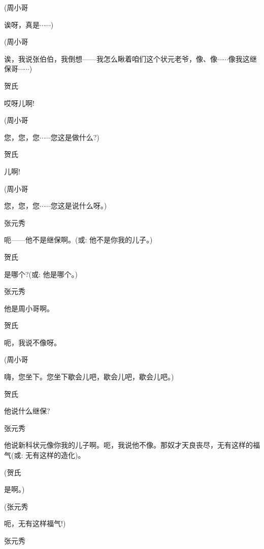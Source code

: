 (周小哥\hspace{20pt}~

诶呀，真是$\cdots{}\cdots{}$)

(周小哥

诶，我说张伯伯，我倒想------我怎么瞅着咱们这个状元老爷，像、像$\cdots{}\cdots{}$像我这继保哥$\cdots{}\cdots{}$)

贺氏\hspace{30pt}~

哎呀儿啊!

(周小哥\hspace{20pt}~

您，您，您$\cdots{}\cdots{}$您这是做什么?)

贺氏\hspace{30pt}~

儿啊!

(周小哥\hspace{20pt}~

您，您，您$\cdots{}\cdots{}$您这是说什么呀。)

张元秀\hspace{20pt}~

呃------他不是继保啊。({\akai 或}: 他不是你我的儿子。)

贺氏\hspace{30pt}~

是哪个?({\akai 或}: 他是哪个。)

张元秀\hspace{20pt}~

他是周小哥啊。

贺氏\hspace{30pt}~

呃，我说不像呀。

(周小哥\hspace{20pt}~

嗨，您坐下。您坐下歇会儿吧，歇会儿吧，歇会儿吧。)

贺氏\hspace{30pt}~

他说什么继保?

张元秀

他说新科状元像你我的儿子啊。呃，我说他不像。那奴才天良丧尽，无有这样的福气({\akai 或}: 无有这样的造化)。

(贺氏\hspace{30pt}~

是啊。)

(张元秀\hspace{20pt}~

呃，无有这样福气!)

张元秀\hspace{20pt}~

